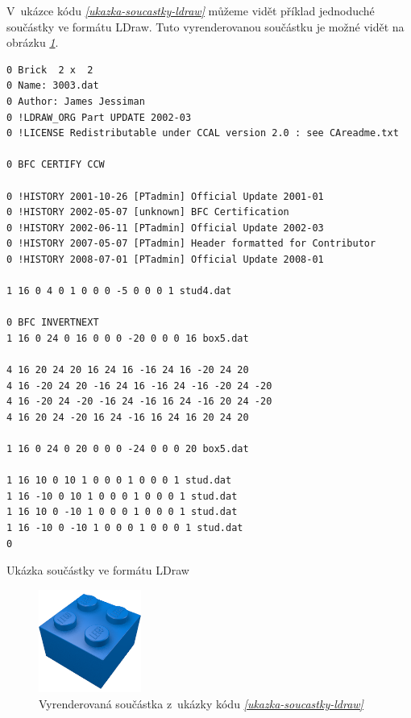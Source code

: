         V~ukázce kódu \emph{\ref{ukazka-soucastky-ldraw}} můžeme vidět příklad jednoduché součástky ve formátu LDraw. Tuto vyrenderovanou součástku je možné vidět na obrázku \emph{\ref{obrazek-ldraw-soucastka}}.
            
       \begin{listing}[htbp]
            \begin{verbatim}
0 Brick  2 x  2
0 Name: 3003.dat
0 Author: James Jessiman
0 !LDRAW_ORG Part UPDATE 2002-03
0 !LICENSE Redistributable under CCAL version 2.0 : see CAreadme.txt

0 BFC CERTIFY CCW

0 !HISTORY 2001-10-26 [PTadmin] Official Update 2001-01
0 !HISTORY 2002-05-07 [unknown] BFC Certification
0 !HISTORY 2002-06-11 [PTadmin] Official Update 2002-03
0 !HISTORY 2007-05-07 [PTadmin] Header formatted for Contributor
0 !HISTORY 2008-07-01 [PTadmin] Official Update 2008-01

1 16 0 4 0 1 0 0 0 -5 0 0 0 1 stud4.dat

0 BFC INVERTNEXT
1 16 0 24 0 16 0 0 0 -20 0 0 0 16 box5.dat

4 16 20 24 20 16 24 16 -16 24 16 -20 24 20
4 16 -20 24 20 -16 24 16 -16 24 -16 -20 24 -20
4 16 -20 24 -20 -16 24 -16 16 24 -16 20 24 -20
4 16 20 24 -20 16 24 -16 16 24 16 20 24 20

1 16 0 24 0 20 0 0 0 -24 0 0 0 20 box5.dat

1 16 10 0 10 1 0 0 0 1 0 0 0 1 stud.dat
1 16 -10 0 10 1 0 0 0 1 0 0 0 1 stud.dat
1 16 10 0 -10 1 0 0 0 1 0 0 0 1 stud.dat
1 16 -10 0 -10 1 0 0 0 1 0 0 0 1 stud.dat
0
            \end{verbatim}
            \caption{Ukázka součástky ve formátu LDraw \autocite{ldraw:model}\label{ukazka-soucastky-ldraw}}
        \end{listing}
  
        \begin{figure}[htbp]
            \centering
            \includegraphics[width=0.3\textwidth,height=\textheight,keepaspectratio]{images/3003.png}
            \caption{Vyrenderovaná součástka z~ukázky kódu \emph{\ref{ukazka-soucastky-ldraw}} \autocite{rebrickable:part:image:3003}\label{obrazek-ldraw-soucastka}}
        \end{figure}


